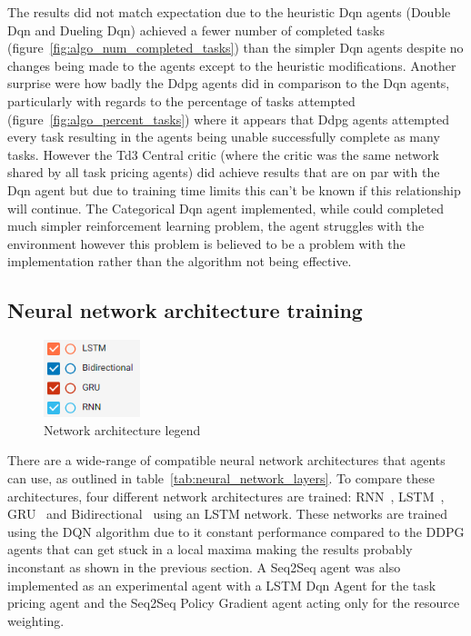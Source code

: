 The results did not match expectation due to the heuristic Dqn agents (Double Dqn and Dueling Dqn) achieved a fewer
number of completed tasks (figure~\ref{fig:algo_num_completed_tasks}) than the simpler Dqn agents despite no changes
being made to the agents except to the heuristic modifications. Another surprise were how badly the Ddpg agents did
in comparison to the Dqn agents, particularly with regards to the percentage of tasks attempted
(figure~\ref{fig:algo_percent_tasks}) where it appears that Ddpg agents attempted every task resulting in the agents
being unable successfully complete as many tasks. However the Td3 Central critic (where the critic was the same network
shared by all task pricing agents) did achieve results that are on par with the Dqn agent but due to training time
limits this can't be known if this relationship will continue. The Categorical Dqn agent implemented, while could
completed much simpler reinforcement learning problem, the agent struggles with the environment however this problem
is believed to be a problem with the implementation rather than the algorithm not being effective.

\subsection{Neural network architecture training}
\label{subsec:neural-network-architecture-training}
\begin{figure}
    \includegraphics[width=0.25\textwidth]{figures/5_evaluation_figs/net_arch_training_fig/legend.png}
    \caption{Network architecture legend}
    \label{fig:net-arch-training-legend}
\end{figure}

There are a wide-range of compatible neural network architectures that agents can use, as outlined in
table~\ref{tab:neural_network_layers}. To compare these architectures, four different network architectures are trained:
RNN~\citep{RNN}, LSTM~\citep{LSTM}, GRU~\citep{GRU} and Bidirectional~\citep{Bidirectional} using an LSTM network.
These networks are trained using the DQN algorithm due to it constant performance compared to the DDPG agents that can
get stuck in a local maxima making the results probably inconstant as shown in the previous section. A Seq2Seq agent
was also implemented as an experimental agent with a LSTM Dqn Agent for the task pricing agent and the Seq2Seq Policy
Gradient agent acting only for the resource weighting. \\

